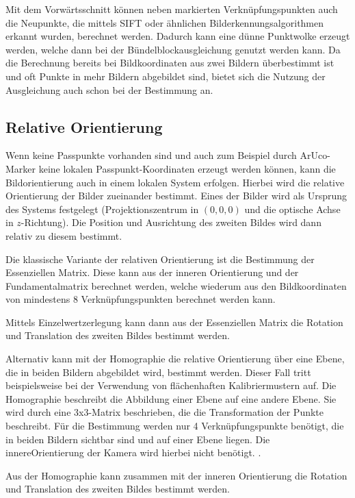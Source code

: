 \documentclass[./00PhotoBox.tex]{subfiles}
\begin{document}
Mit dem Vorwärts\-schnitt können neben markierten Verknüpfungspunkten auch die Neupunkte, die mittels SIFT oder ähnlichen Bild\-erkennungs\-algorithmen erkannt wurden, berechnet werden. Dadurch kann eine dünne Punktwolke erzeugt werden, welche dann bei der Bündelblockausgleichung genutzt werden kann. Da die Berechnung bereits bei Bildkoordinaten aus zwei Bildern überbestimmt ist und oft Punkte in mehr Bildern abgebildet sind, bietet sich die Nutzung der Ausgleichung auch schon bei der Bestimmung an. \citep[S. 385]{luhmann}

\subsection{Relative Orientierung}
\label{ss:relative_orientierung}
Wenn keine Passpunkte vorhanden sind und auch zum Beispiel durch ArUco-Marker keine lokalen Passpunkt-Koordinaten erzeugt werden können, kann die Bildorientierung auch in einem lokalen System erfolgen. Hierbei wird die relative Orientierung der Bilder zueinander bestimmt. Eines der Bilder wird als Ursprung des Systems festgelegt (Projektionszentrum in $(0,0,0)$ und die optische Achse in $z$-Richtung). Die Position und Ausrichtung des zweiten Bildes wird dann relativ zu diesem bestimmt. \citep[S. 316]{luhmann}

Die klassische Variante der relativen Orientierung ist die Bestimmung der Essenziellen Matrix. Diese kann aus der inneren Orientierung und der Fundamentalmatrix berechnet werden, welche wiederum aus den Bildkoordinaten von mindestens 8 Verknüpfungspunkten berechnet werden kann. \citep[S. 328ff]{luhmann}

Mittels Einzelwertzerlegung kann dann aus der Essenziellen Matrix die Rotation und Translation des zweiten Bildes bestimmt werden. \citep[S. 275]{hartley}

Alternativ kann mit der Homographie die relative Orientierung über eine Ebene, die in beiden Bildern abgebildet wird, bestimmt werden. Dieser Fall tritt beispielsweise bei der Verwendung von flächenhaften Kalibriermustern auf. Die Homographie beschreibt die Abbildung einer Ebene auf eine andere Ebene. Sie wird durch eine 3x3-Matrix beschrieben, die die Transformation der Punkte beschreibt. Für die Bestimmung werden nur 4 Verknüpfungspunkte benötigt, die in beiden Bildern sichtbar sind und auf einer Ebene liegen. Die \gls{innereOrientierung} der Kamera wird hierbei nicht benötigt. \citep[S. 33ff]{hartley}.

Aus der Homographie kann zusammen mit der inneren Orientierung die Rotation und Translation des zweiten Bildes bestimmt werden.
\citep[S. 74]{homography_decomposition}
\end{document}
